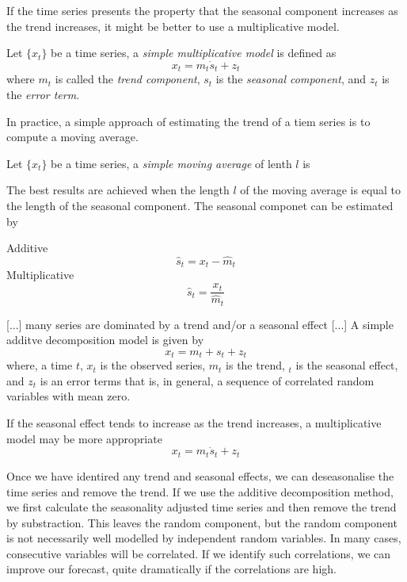 If the time series presents the property that the seasonal component increases as the trend increases, it might be better to use a multiplicative model.

\begin{definition}
    Let $\{ x_t \}$ be a time series, a \emph{simple multiplicative model} is defined as
    \[
        x_t = m_t \dot s_t + z_t
    \]
    where $m_t$ is called the \emph{trend component}, $s_t$ is the \emph{seasonal component}, and $z_t$ is the \emph{error term}.
\end{definition}

In practice, a simple approach of estimating the trend of a tiem series is to compute a moving average.

\begin{definition}
    Let $\{ x_t \}$ be a time series, a \emph{simple moving average} of lenth $l$ is 
\end{definition}

The best results are achieved when the length $l$ of the moving average is equal to the length of the seasonal component. The seasonal componet can be estimated by

\begin{definition}
    Additive
    \[
        \hat{s}_t = x_t - \hat{m}_t
    \]
    Multiplicative
    \[
        \hat{s}_t = \frac{x_t}{\hat{m}_t}
    \]
\end{definition}


{\color{red} [...] many series are dominated by a trend and/or a seasonal effect [...] A simple additve decomposition model is given by
\[
    x_t = m_t + s_t + z_t
\]
where, a time $t$, $x_t$ is the observed series, $m_t$ is the trend, $_t$ is the seasonal effect, and $z_t$ is an error terms that is, in general, a sequence of correlated random variables with mean zero.

If the seasonal effect tends to increase as the trend increases, a multiplicative model may be more appropriate
\[
    x_t = m_t \dot s_t + z_t
\]

}

\begin{definition}
    
\end{definition}

{\color{red} Once we have identired any trend and seasonal effects, we can deseasonalise the time series and remove the trend. If we use the additive decomposition method, we first calculate the seasonality adjusted time series and then remove the trend by substraction. This leaves the random component, but the random component is not necessarily well modelled by independent random variables. In many cases, consecutive variables will be correlated. If we identify such correlations, we can improve our forecast, quite dramatically if the correlations are high.}

